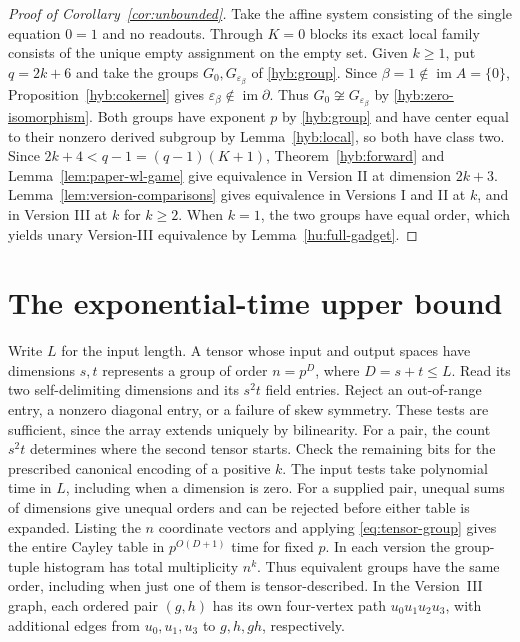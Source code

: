 \documentclass[11pt]{article}
\DeclareMathOperator{\im}{im}
\theoremstyle{definition}
\theoremstyle{remark}
\numberwithin{equation}{section}
\begin{document}
\begin{proof}[Proof of Corollary~\ref{cor:unbounded}]
Take the affine system consisting of the single equation $0=1$ and
no readouts. Through $K=0$ blocks its exact local family consists of
the unique empty assignment on the empty set. Given $k\ge1$, put
$q=2k+6$ and take the groups $G_0,G_{\varepsilon_\beta}$ of
\eqref{hyb:group}. Since $\beta=1\notin\im A=\{0\}$,
Proposition~\ref{hyb:cokernel} gives $\varepsilon_\beta\notin\im\partial$.
Thus $G_0\not\cong G_{\varepsilon_\beta}$ by \eqref{hyb:zero-isomorphism}.
Both groups have exponent $p$ by \eqref{hyb:group} and have center
equal to their nonzero derived subgroup by Lemma~\ref{hyb:local}, so
both have class two. Since
$2k+4<q-1=(q-1)(K+1)$, Theorem~\ref{hyb:forward} and
Lemma~\ref{lem:paper-wl-game} give equivalence in Version II at
dimension $2k+3$. Lemma~\ref{lem:version-comparisons} gives
equivalence in Versions I and II at $k$, and in Version III at $k$
for $k\ge2$. When $k=1$, the two groups have equal order, which yields
unary Version-III equivalence by Lemma~\ref{hu:full-gadget}.
\end{proof}

\section{The exponential-time upper bound}
\label{hu:section}

Write $L$ for the input length. A tensor whose input and output spaces
have dimensions $s,t$ represents a group of order $n=p^D$, where
$D=s+t\le L$. Read its two self-delimiting dimensions and its $s^2t$
field entries. Reject an out-of-range entry, a nonzero diagonal entry,
or a failure of skew symmetry. These tests are sufficient, since the
array extends uniquely by bilinearity. For a pair, the count $s^2t$
determines where the second tensor starts. Check the remaining bits
for the prescribed canonical encoding of a positive $k$.
The input tests take polynomial time in $L$, including when a
dimension is zero. For a supplied pair, unequal sums of dimensions give
unequal orders and can be rejected before either table is expanded.
Listing the $n$ coordinate vectors and applying
\eqref{eq:tensor-group} gives the entire Cayley table in
$p^{O(D+1)}$ time for fixed $p$. In each version the group-tuple
histogram has total multiplicity $n^k$. Thus equivalent groups have
the same order, including when just one of them is tensor-described.
In the Version~III graph, each ordered pair $(g,h)$ has its own
four-vertex path $u_0u_1u_2u_3$, with additional edges from
$u_0,u_1,u_3$ to $g,h,gh$, respectively.
\end{document}
